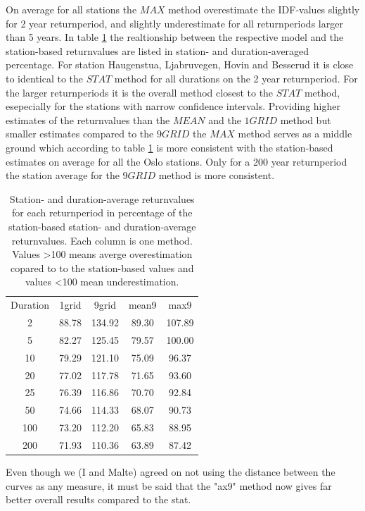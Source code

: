 On average for all stations the $MAX$ method overestimate the IDF-values slightly for 2 year returnperiod, and slightly underestimate for all returnperiods larger than 5 years. In table \ref{dist_eval} the realtionship between the respective model and the station-based returnvalues are listed in station- and duration-averaged percentage. For station Haugenstua, Ljabruvegen, Hovin and Besserud it is close to identical to the $STAT$ method for all durations on the 2 year returnperiod. For the larger returnperiods it is the overall method closest to the $STAT$ method, esepecially for the stations with narrow confidence intervals. Providing higher estimates of the returnvalues than the $MEAN$ and the $1GRID$ method but smaller estimates compared to the $9GRID$ the $MAX$ method serves as a middle ground which according to table \ref{dist_eval} is more consistent with the station-based estimates on average for all the Oslo stations. Only for a 200 year returnperiod the station average for the $9GRID$ method is more consistent.        

\begin{table}[hbt!]
\centering
\begin{tabular}{ c c c c c}

Duration & 1grid & 9grid & mean9 & max9 \\
2 & 88.78 & 134.92 & 89.30 & 107.89\\
5 & 82.27 & 125.45 & 79.57 & 100.00\\
10 & 79.29 & 121.10 & 75.09 & 96.37\\
20 & 77.02 & 117.78 & 71.65 & 93.60\\
25 & 76.39 & 116.86 & 70.70 & 92.84\\
50 & 74.66 & 114.33 & 68.07 & 90.73\\
100 & 73.20 & 112.20 & 65.83 & 88.95\\
200 & 71.93 & 110.36 & 63.89 & 87.42
\end{tabular}
\caption{Station- and duration-average returnvalues for each returnperiod in percentage of the station-based station- and duration-average returnvalues. Each column is one method. Values >100 means averge overestimation copared to to the station-based values and values <100 mean underestimation.}
\label{dist_eval}
\end{table}


Even though we (I and Malte) agreed on not using the distance between the curves as any measure, it must be said that the "ax9" method now gives far better overall results compared to the stat.

